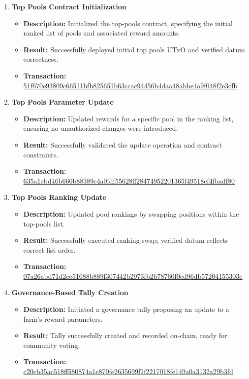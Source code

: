 \documentclass{article}
\begin{document}
\begin{enumerate}
    \item \textbf{Top Pools Contract Initialization}
    \begin{itemize}
        \item \textbf{Description:} Initialized the top-pools contract, specifying the initial ranked list of pools and associated reward amounts.
        \item \textbf{Result:} Successfully deployed initial top pools UTxO and verified datum correctness.
        \item \textbf{Transaction:} \href{https://preprod.cexplorer.io/tx/51f670e93809c66511bfb825651b63ccac94456b4daa48abbe1a9f048f2e3cfb}{51f670e93809c66511bfb825651b63ccac94456b4daa48abbe1a9f048f2e3cfb}
    \end{itemize}

    \item \textbf{Top Pools Parameter Update}
    \begin{itemize}
        \item \textbf{Description:} Updated rewards for a specific pool in the ranking list, ensuring no unauthorized changes were introduced.
        \item \textbf{Result:} Successfully validated the update operation and contract constraints.
        \item \textbf{Transaction:} \href{https://preprod.cexplorer.io/tx/635a1ebd46b660b88389c4a0fdf55628ff28474952201365f49518ef4fbadf80}{635a1ebd46b660b88389c4a0fdf55628ff28474952201365f49518ef4fbadf80}
    \end{itemize}

    \item \textbf{Top Pools Ranking Update}
    \begin{itemize}
        \item \textbf{Description:} Updated pool rankings by swapping positions within the top-pools list.
        \item \textbf{Result:} Successfully executed ranking swap; verified datum reflects correct list order.
        \item \textbf{Transaction:} \href{https://preprod.cexplorer.io/tx/07a26abd71d2ce51688b889f307442b2973fb2b78760f0cd96db57204155303c}{07a26abd71d2ce51688b889f307442b2973fb2b78760f0cd96db57204155303c}
    \end{itemize}

    \item \textbf{Governance-Based Tally Creation}
    \begin{itemize}
        \item \textbf{Description:} Initiated a governance tally proposing an update to a farm's reward parameters.
        \item \textbf{Result:} Tally successfully created and recorded on-chain, ready for community voting.
        \item \textbf{Transaction:} \href{https://preprod.cexplorer.io/tx/c20cb35ac518ff580874a1e870fe2635699f1f2217018fe149a0a3132a29b3fd}{c20cb35ac518ff580874a1e870fe2635699f1f2217018fe149a0a3132a29b3fd}
    \end{itemize}


\end{enumerate}
\end{document}
